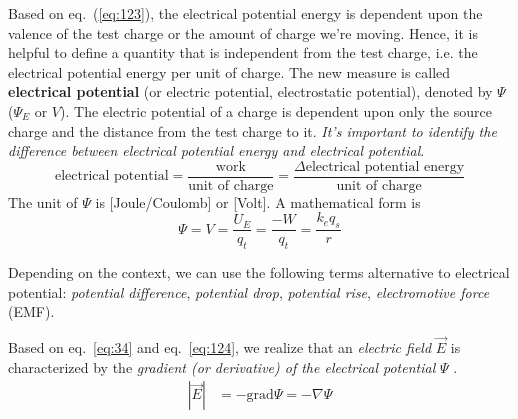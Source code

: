 Based on eq.~(\ref{eq:123}), the electrical potential energy is
dependent upon the valence of the test charge or the amount of charge
we're moving. Hence, it is helpful to define a quantity that is
independent from the test charge, i.e.  the electrical potential
energy per unit of charge. The new measure is called
{\bf electrical potential} (or electric potential, electrostatic
potential), denoted by $\Psi$ ($\Psi_E$ or $V$).  The electric
potential of a charge is dependent upon only the source charge and the
distance from the test charge to it.
{\it It's important to identify the difference between electrical
  potential energy and electrical potential}.
\begin{equation}
  \label{eq:42}
  \text{electrical potential} = \frac{\text{work}}{\text{unit of charge}} =
  \frac{\Delta \text{electrical potential energy}} {\text{unit of charge}}
\end{equation}
The unit of $\Psi$ is [Joule/Coulomb] or [Volt]. A mathematical form
is
\begin{equation}
  \label{eq:124}
  \Psi = V = \frac{U_E}{q_t} = \frac{-W}{q_t} = \frac{k_eq_s}{r}
\end{equation}


Depending on the context, we can use the following terms
alternative to electrical potential: {\it potential difference},
{\it potential drop}, {\it potential rise}, {\it electromotive force}
(EMF).


Based on eq.~\eqref{eq:34} and eq.~\eqref{eq:124}, we realize that an
{\it electric field} $\vec{E}$ is characterized by the
{\it gradient (or derivative) of the electrical potential} $\Psi$ .
\begin{equation}\label{eq:electrical-potential}
\begin{split}
  |\vec{E}| &= -\text{grad}\Psi = -\nabla \Psi \\
\end{split}
\end{equation}




